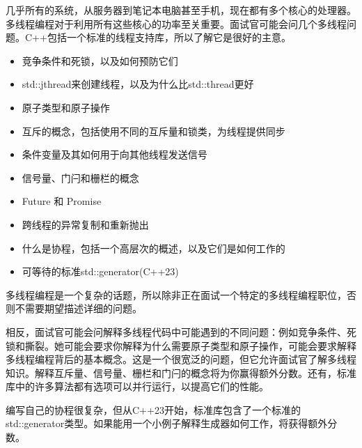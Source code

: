 
几乎所有的系统，从服务器到笔记本电脑甚至手机，现在都有多个核心的处理器。多线程编程对于利用所有这些核心的功率至关重要。面试官可能会问几个多线程问题。C++包括一个标准的线程支持库，所以了解它是很好的主意。


\begin{itemize}
\item
竞争条件和死锁，以及如何预防它们

\item
std::jthread来创建线程，以及为什么比std::thread更好

\item
原子类型和原子操作

\item
互斥的概念，包括使用不同的互斥量和锁类，为线程提供同步

\item
条件变量及其如何用于向其他线程发送信号

\item
信号量、门闩和栅栏的概念

\item
Future 和 Promise

\item
跨线程的异常复制和重新抛出

\item
什么是协程，包括一个高层次的概述，以及它们是如何工作的

\item
可等待的标准std::generator(C++23)
\end{itemize}


多线程编程是一个复杂的话题，所以除非正在面试一个特定的多线程编程职位，否则不需要期望描述详细的问题。

相反，面试官可能会问解释多线程代码中可能遇到的不同问题：例如竞争条件、死锁和撕裂。她可能会要求你解释为什么需要原子类型和原子操作，可能会要求解释多线程编程背后的基本概念。这是一个很宽泛的问题，但它允许面试官了解多线程知识。解释互斥量、信号量、栅栏和门闩的概念将为你赢得额外分数。还有，标准库中的许多算法都有选项可以并行运行，以提高它们的性能。

编写自己的协程很复杂，但从C++23开始，标准库包含了一个标准的std::generator类型。如果能用一个小例子解释生成器如何工作，将获得额外分数。

